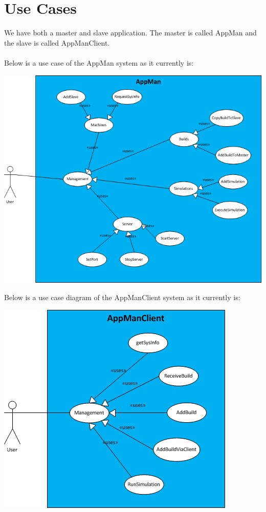 \documentclass[a4paper,12pt,final]{article}
\begin{document}
\section{Use Cases}
We have both a master and slave application. The master is called AppMan and the slave is called AppManClient.\\
\textbf{\\}
Below is a use case of the AppMan system as it currently is:\\
\begin{center}
\includegraphics[scale=0.8]{AppManUseCase.png}
\end{center}
Below is a use case diagram of the AppManClient system as it currently is:\\
\begin{center}
\includegraphics[scale=0.7]{AppManClientUseCase.png}
\end{center}
\end{document}
